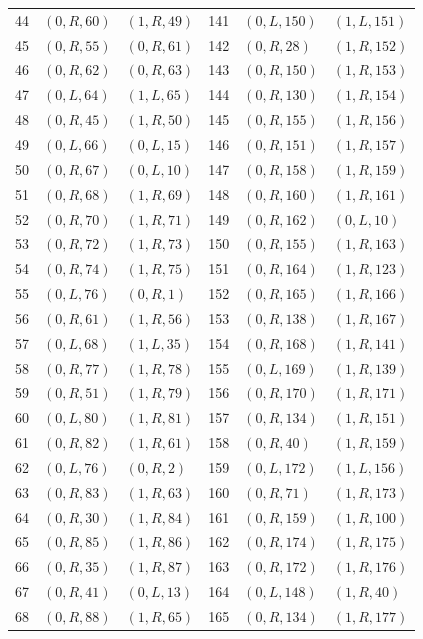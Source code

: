 \begin{longtable}{r@{\quad}ll@{\qquad}r@{\quad}ll}
44 & $(0,R,60)$ & $(1,R,49)$ & 141 & $(0,L,150)$ & $(1,L,151)$\\
45 & $(0,R,55)$ & $(0,R,61)$ & 142 & $(0,R,28)$ & $(1,R,152)$\\
46 & $(0,R,62)$ & $(0,R,63)$ & 143 & $(0,R,150)$ & $(1,R,153)$\\
47 & $(0,L,64)$ & $(1,L,65)$ & 144 & $(0,R,130)$ & $(1,R,154)$\\
48 & $(0,R,45)$ & $(1,R,50)$ & 145 & $(0,R,155)$ & $(1,R,156)$\\
49 & $(0,L,66)$ & $(0,L,15)$ & 146 & $(0,R,151)$ & $(1,R,157)$\\
50 & $(0,R,67)$ & $(0,L,10)$ & 147 & $(0,R,158)$ & $(1,R,159)$\\
51 & $(0,R,68)$ & $(1,R,69)$ & 148 & $(0,R,160)$ & $(1,R,161)$\\
52 & $(0,R,70)$ & $(1,R,71)$ & 149 & $(0,R,162)$ & $(0,L,10)$\\
53 & $(0,R,72)$ & $(1,R,73)$ & 150 & $(0,R,155)$ & $(1,R,163)$\\
54 & $(0,R,74)$ & $(1,R,75)$ & 151 & $(0,R,164)$ & $(1,R,123)$\\
55 & $(0,L,76)$ & $(0,R,1)$ & 152 & $(0,R,165)$ & $(1,R,166)$\\
56 & $(0,R,61)$ & $(1,R,56)$ & 153 & $(0,R,138)$ & $(1,R,167)$\\
57 & $(0,L,68)$ & $(1,L,35)$ & 154 & $(0,R,168)$ & $(1,R,141)$\\
58 & $(0,R,77)$ & $(1,R,78)$ & 155 & $(0,L,169)$ & $(1,R,139)$\\
59 & $(0,R,51)$ & $(1,R,79)$ & 156 & $(0,R,170)$ & $(1,R,171)$\\
60 & $(0,L,80)$ & $(1,R,81)$ & 157 & $(0,R,134)$ & $(1,R,151)$\\
61 & $(0,R,82)$ & $(1,R,61)$ & 158 & $(0,R,40)$ & $(1,R,159)$\\
62 & $(0,L,76)$ & $(0,R,2)$ & 159 & $(0,L,172)$ & $(1,L,156)$\\
63 & $(0,R,83)$ & $(1,R,63)$ & 160 & $(0,R,71)$ & $(1,R,173)$\\
64 & $(0,R,30)$ & $(1,R,84)$ & 161 & $(0,R,159)$ & $(1,R,100)$\\
65 & $(0,R,85)$ & $(1,R,86)$ & 162 & $(0,R,174)$ & $(1,R,175)$\\
66 & $(0,R,35)$ & $(1,R,87)$ & 163 & $(0,R,172)$ & $(1,R,176)$\\
67 & $(0,R,41)$ & $(0,L,13)$ & 164 & $(0,L,148)$ & $(1,R,40)$\\
68 & $(0,R,88)$ & $(1,R,65)$ & 165 & $(0,R,134)$ & $(1,R,177)$\\

\end{longtable}

